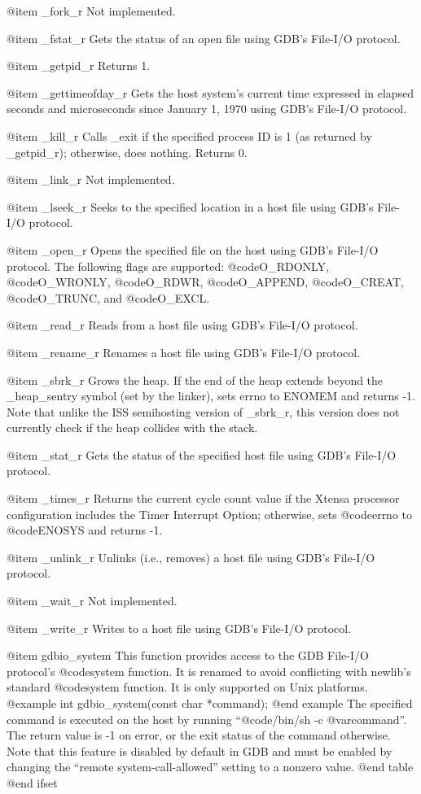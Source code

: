 @item _fork_r
Not implemented.

@item _fstat_r
Gets the status of an open file using GDB's File-I/O protocol.

@item _getpid_r
Returns 1.

@item _gettimeofday_r
Gets the host system's current time expressed in elapsed seconds and
microseconds since January 1, 1970 using GDB's File-I/O protocol.

@item _kill_r
Calls _exit if the specified process ID is 1 (as returned by _getpid_r);
otherwise, does nothing. Returns 0.

@item _link_r
Not implemented.

@item _lseek_r
Seeks to the specified location in a host file using GDB's File-I/O protocol.

@item _open_r
Opens the specified file on the host using GDB's File-I/O protocol.  The
following flags are supported: @code{O_RDONLY}, @code{O_WRONLY},
@code{O_RDWR}, @code{O_APPEND}, @code{O_CREAT}, @code{O_TRUNC}, and
@code{O_EXCL}.

@item _read_r
Reads from a host file using GDB's File-I/O protocol.

@item _rename_r
Renames a host file using GDB's File-I/O protocol.

@item _sbrk_r
Grows the heap. If the end of the heap extends beyond the _heap_sentry
symbol (set by the linker), sets errno to ENOMEM and returns -1.
Note that unlike the ISS semihosting version of _sbrk_r, this version
does not currently check if the heap collides with the stack.

@item _stat_r
Gets the status of the specified host file using GDB's File-I/O protocol.

@item _times_r
Returns the current cycle count value if the Xtensa processor
configuration includes the Timer Interrupt Option; otherwise, sets
@code{errno} to @code{ENOSYS} and returns -1.

@item _unlink_r
Unlinks (i.e., removes) a host file using GDB's File-I/O protocol.

@item _wait_r
Not implemented.

@item _write_r
Writes to a host file using GDB's File-I/O protocol.

@item gdbio_system
This function provides access to the GDB File-I/O protocol's @code{system}
function.  It is renamed to avoid conflicting with newlib's standard
@code{system} function.  It is only supported on Unix platforms.
@example
int gdbio_system(const char *command);
@end example
The specified command is executed on the host by running
``@code{/bin/sh -c @var{command}}''.  The return value is -1 on error, or
the exit status of the command otherwise.  Note that this feature is
disabled by default in GDB and must be enabled by changing the
``remote system-call-allowed'' setting to a nonzero value.
@end table
@end ifset
